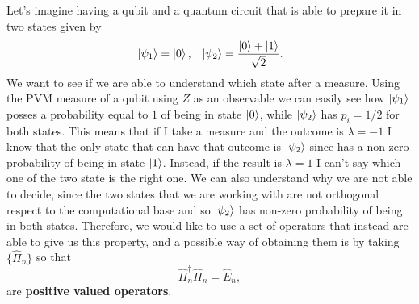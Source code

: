 Let's imagine having a qubit and a quantum circuit that is able to prepare it in two states given by
\begin{align}
    &\ket{\psi_1} = \ket{0}, & \ket{\psi_2} = \frac{\ket{0} + \ket{1}}{\sqrt{2}}.
\end{align}
We want to see if we are able to understand which state after a measure. Using the PVM measure of a qubit using $Z$ as an observable we can easily see how $\ket{\psi_1}$ posses a probability equal to $1$ of being in state $\ket{0}$, while $\ket{\psi_2}$ has $p_i = 1/2$ for both states. This means that if I take a measure and the outcome is $\lambda = -1$ I know that the only state that can have that outcome is $\ket{\psi_2}$ since has a non-zero probability of being in state $\ket{1}$. Instead, if the result is $\lambda = 1$ I can't say which one of the two state is the right one. We can also understand why we are not able to decide, since the two states that we are working with are not orthogonal respect to the computational base and so $\ket{\psi_2}$ has non-zero probability of being in both states. Therefore, we would like to use a set of operators that instead are able to give us this property, and a possible way of obtaining them is by taking $\{ \hat{\Pi}_n \}$ so that
\begin{equation}
    \hat{\Pi}_n^\dagger\hat{\Pi}_n = \hat{E}_n,
\end{equation}
are \textbf{positive valued operators}.